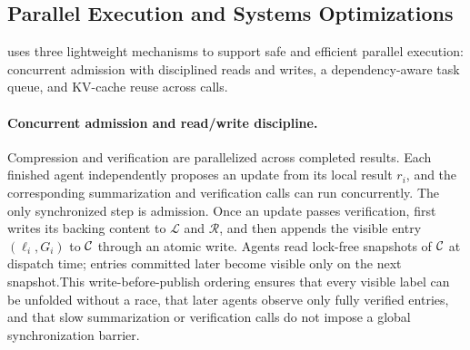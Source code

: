 
\subsection{Parallel Execution and Systems Optimizations}
\label{sec:orchestration}
\toolName{} uses three lightweight mechanisms to support safe and efficient
parallel execution: concurrent admission with disciplined reads and writes, a dependency-aware task queue, and KV-cache reuse across calls.

\paragraph{Concurrent admission and read/write discipline.}
Compression and verification are parallelized across completed results. Each finished agent independently proposes an update from its local result $r_i$, and the corresponding summarization and verification calls can run concurrently. The only synchronized step is admission. Once an update passes verification, \toolName{} first writes its backing content to $\mathcal{L}$ and $\mathcal{R}$, and then appends the visible entry $(\ell_i, G_i)$ to $\mathcal{C}$ through an atomic write. Agents read lock-free snapshots of $\mathcal{C}$ at dispatch time; entries committed later become visible only on the next snapshot.This write-before-publish ordering ensures that every visible label can be unfolded without a race, that later agents observe only fully verified entries, and that slow summarization or verification calls do not impose a global synchronization barrier.

